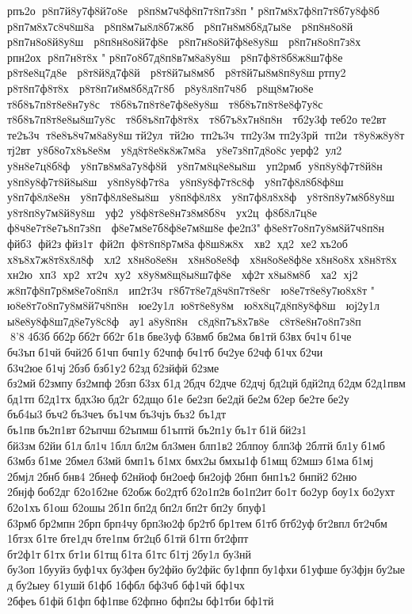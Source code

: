  рпъ2о  р8п7й8у7ф8й7о8е   р8п8м7ч8ф8п7т8п7з8п  " р8п7м8х7ф8п7т8б7у8ф8б   р8п7м8х7с8ч8ш8а   р8п8м7ы8л8б7ж8б   р8п7н8м8б8д7ы8е   р8п8н8о8й   р8п7н8о8й8у8ш   р8п8н8о8й7ф8е   р8п7н8о8й7ф8е8у8ш   р8п7н8о8п7з8х   рпн2ох  р8п7н8т8х  " р8п7о8б7д8п8в7м8а8у8ш   р8п7ф8т8б8ж8ш7ф8е   р8т8е8ц7д8е   р8т8й8д7ф8й   р8т8й7ы8м8б   р8т8й7ы8м8п8у8ш  
 ртпу2  р8т8п7ф8т8х   р8т8п7и8м8б8д7г8б   р8у8л8п7ч8б   р8щ8м7ю8е   т8б8ъ7п8т8е8н7у8с   т8б8ъ7п8т8е7ф8е8у8ш   т8б8ъ7п8т8е8ф7у8с   т8б8ъ7п8т8е8ы8ш7у8с   т8б8ъ8п7ф8т8х   т8б7ъ8х7н8п8н   тб2у3ф 
 теб2о 
 те2вт  те2ъ3ч  т8е8ъ8ч7м8а8у8ш  
 тй2ул  тй2ю  тп2ъ3ч  тп2у3м 
 тп2у3рй  тп2и  т8у8ж8у8т  
 тј2вт  у8б8о7х8ъ8е8м   у8д8т8е8к8ж7м8а   у8е7з8п7д8о8с  
 уерф2  ул2  у8н8е7ц8б8ф   у8п7в8м8а7у8ф8й   у8п7м8ц8е8ы8ш   уп2рмб  у8п8у8ф7т8й8н   у8п8у8ф7т8й8ы8ш   у8п8у8ф7т8а   у8п8у8ф7т8с8ф   у8п7ф8л8б8ф8ш   у8п7ф8л8е8н   у8п7ф8л8е8ы8ш   у8п8ф8л8х   у8п7ф8л8х8ф   у8т8п8у7м8б8у8ш   у8т8п8у7м8й8у8ш   уф2  у8ф8т8е8н7з8м8б8ч   ух2ц  ф8б8л7ц8е   ф8ч8е7т8е7ъ8п7з8п   ф8е7м8е7б8ф8е7м8ш8е  	 фе2п3 " ф8е8т7о8п7у8м8й7ч8п8н   фйб3  фй2з 
 фйз1т  фй2п  ф8т8п8р7м8а  
 ф8ш8ж8х   хв2  хд2  хе2 
 хъ2об  х8ъ8х7ж8т8х8л8ф   хл2  х8н8о8е8н   х8н8о8е8ф   х8н8о8е8ф8е  
 х8н8о8х  
 х8н8т8х   хн2ю  хп3  хр2  хт2ч  ху2  х8у8м8щ8ы8ш7ф8е   хф2т 
 х8ы8м8б   ха2  хј2  ж8п7ф8п7р8м8е7о8п8л   ип2т3ч  г8б7т8е7д8ч8п7т8е8г   ю8е7т8е8у7ю8х8т  " ю8е8т7о8п7у8м8й7ч8п8н   юе2у1л  ю8т8е8у8м   ю8х8ц7д8п8у8ф8ш   юј2у1л  ы8е8у8ф8ш7д8е7у8с8ф   ау1 
 а8у8п8н   с8д8п7ъ8х7в8е   с8т8е8н7о8п7з8п  8'8 4б3б бб2р бб2т бб2г б1в бве3уф 	б3вмб 	бв2ма 	бв1тй б3вх бч1ч б1че 	бч3ъп б1чй 	бчй2б б1чп 	бчп1у 	б2чпф 	бч1тб 	бч2уе б2чф б1чх б2чи 
б3ч2юе б1чј 2бзб 
бзб1у2 б2зд б2зйфй 	б2зме 	бз2мй б2змпу бз2мпф 2бзп б3зх б1д 2бдч 	б2дче 	б2дчј 	бд2цй бдй2пд б2дм б2д1пвм 	бд1тп 
б2д1тх 	бдх3ю бд2г 	б2дщо б1е 	бе2зп 	бе2дй бе2м б2ер 	бе2те бе2у 
бъб4ы3 бъч2 бъ3чеъ 	бъ1чм бъ3чјъ бъз2 	бъ1дт 	бъ1пв бъ2п1вт б2ъпчш б2ъпмш б1ъптй 
бъ2п1у бъ1т б1й бй2з1 	бй3зм б2йи б1л бл1ч 1блл бл2м бл3мен 
блп1в2 2блпоу 	блп3ф 	2блтй бл1у б1мб 	б3мбз б1ме 	2бмел б3мй 	бмп1ъ б1мх 	бмх2ы бмхы1ф б1мщ 	б2мшэ б1ма б1мј 	2бмјл 2бнб бнв4 	2бнеф б2нйоф бн2оеф бн2ојф 2бнп 
бнп1ъ2 	бнпй2 б2ню 	2бнјф боб2дг 
б2о1б2не 	б2обж бо2дтб б2о1п2в бо1п2ит бо1т 	бо2ур 	боу1х бо2ухт 
б2о1хъ б1ош 	б2ошы 2б1п бп2д бп2л бп2т бп2у 	бпуф1 	б3рмб бр2мпн 2брп брп4чу брп3ю2ф 	бр2тб бр1тем б1тб бтб2уф бт2впл бт2чбм 	1бтзх б1те бте1дч бте1пм 	бт2цб б1тй б1тп бт2фпт 
бт2ф1т б1тх бт1и б1тщ б1та б1тс б1тј 2бу1л 	бу3нй 	бу3оп 1бууйз буф1чх бу3фен бу2фйо бу2фйс бу1фпп бу1фхи б1уфше бу3фјн бу2ыед бу2ыеу 	б1ушй б1фб 	1бфбл 	бф3чб 	бф1чй 	бф1чх 	2бфеъ б1фй б1фп бф1пве б2фпно 	бфп2ы бф1тби 	бф1тй 
